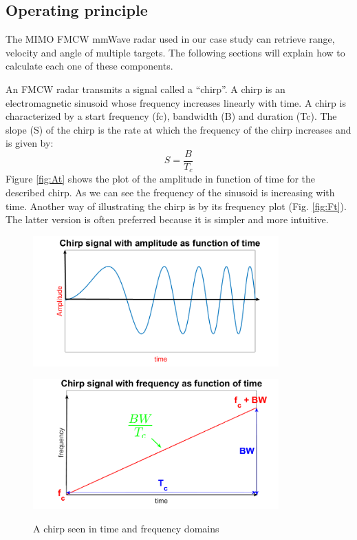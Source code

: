 \subsection{Operating principle}
The \ac{MIMO} \ac{FMCW} \ac{mmWave}  radar used in our case study can retrieve range, velocity and angle of multiple targets. The following sections will explain how to calculate each one of these components.


An \ac{FMCW} radar transmits a signal called a “chirp”. A chirp is an electromagnetic sinusoid whose frequency  increases linearly with time. A chirp is characterized by a start frequency (fc), bandwidth (B) and duration (Tc). The slope (S) of the chirp is the rate at which the frequency of the chirp increases and is given by:
\begin{equation}
    S=\frac{B}{T_c}
\end{equation}
Figure \ref{fig:At} shows the plot of the amplitude in function of time for the described chirp. As we can see the frequency of the sinusoid is increasing with time. Another way of illustrating the chirp is by its frequency plot (Fig. \ref{fig:Ft}). The latter version is often preferred because it is simpler and more intuitive.

\begin{figure}[ht] 
    \begin{minipage}[b]{.49\linewidth}
        \includegraphics[height=5cm,width=\linewidth]{imgs/chapter2/chirpAt.png}
        \label{fig:At}
    \end{minipage}
    \begin{minipage}[b]{.49\linewidth}
        \includegraphics[height=5cm,width=\linewidth]{imgs/chapter2/chirpFt.png}
        \label{fig:Ft}
    \end{minipage}
    \caption{A chirp seen in time and frequency domains}
    \label{fig:chirp}
\end{figure}

